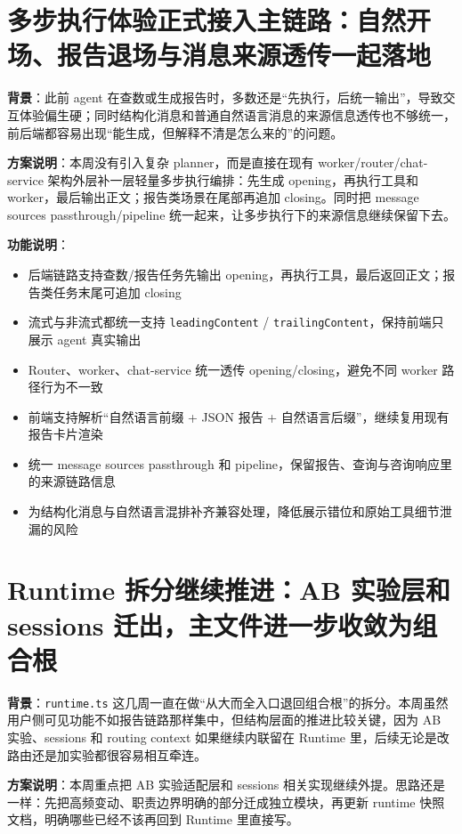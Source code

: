 \documentclass[UTF8]{ctexart}
\begin{document}
\section{多步执行体验正式接入主链路：自然开场、报告退场与消息来源透传一起落地}

\textbf{背景}：此前 agent 在查数或生成报告时，多数还是“先执行，后统一输出”，导致交互体验偏生硬；同时结构化消息和普通自然语言消息的来源信息透传也不够统一，前后端都容易出现“能生成，但解释不清是怎么来的”的问题。

\textbf{方案说明}：本周没有引入复杂 planner，而是直接在现有 worker/router/chat-service 架构外层补一层轻量多步执行编排：先生成 opening，再执行工具和 worker，最后输出正文；报告类场景在尾部再追加 closing。同时把 message sources passthrough/pipeline 统一起来，让多步执行下的来源信息继续保留下去。

\textbf{功能说明}：
\begin{itemize}
\item 后端链路支持查数/报告任务先输出 opening，再执行工具，最后返回正文；报告类任务末尾可追加 closing
\item 流式与非流式都统一支持 \texttt{leadingContent} / \texttt{trailingContent}，保持前端只展示 agent 真实输出
\item Router、worker、chat-service 统一透传 opening/closing，避免不同 worker 路径行为不一致
\item 前端支持解析“自然语言前缀 + JSON 报告 + 自然语言后缀”，继续复用现有报告卡片渲染
\item 统一 message sources passthrough 和 pipeline，保留报告、查询与咨询响应里的来源链路信息
\item 为结构化消息与自然语言混排补齐兼容处理，降低展示错位和原始工具细节泄漏的风险
\end{itemize}

\section{Runtime 拆分继续推进：AB 实验层和 sessions 迁出，主文件进一步收敛为组合根}

\textbf{背景}：\texttt{runtime.ts} 这几周一直在做“从大而全入口退回组合根”的拆分。本周虽然用户侧可见功能不如报告链路那样集中，但结构层面的推进比较关键，因为 AB 实验、sessions 和 routing context 如果继续内联留在 Runtime 里，后续无论是改路由还是加实验都很容易相互牵连。

\textbf{方案说明}：本周重点把 AB 实验适配层和 sessions 相关实现继续外提。思路还是一样：先把高频变动、职责边界明确的部分迁成独立模块，再更新 runtime 快照文档，明确哪些已经不该再回到 Runtime 里直接写。
\end{document}
